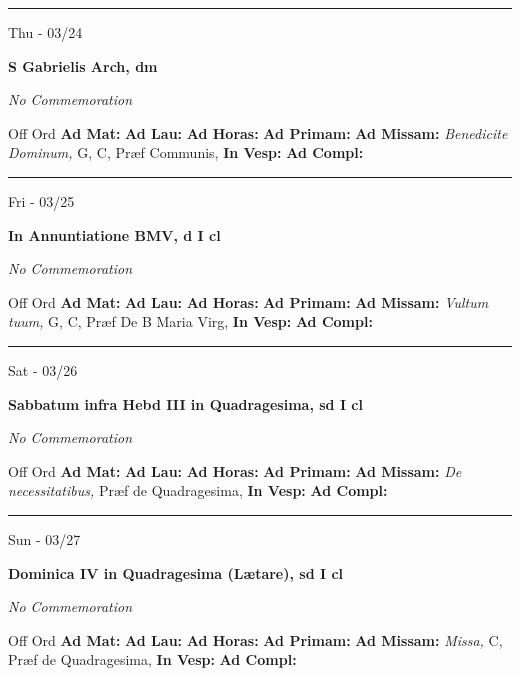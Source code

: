 \documentclass[letterpaper, 10pt]{article}
\begin{document}
\hrule
\begin{center}
Thu - 03/24
\end{center}\textbf{ \large S Gabrielis Arch, \textnormal{\normalsize dm}}

\textit{No Commemoration}\begin{justify}
Off Ord
\textbf{Ad Mat: }
\textbf{Ad Lau: }
\textbf{Ad Horas: }
\textbf{Ad Primam: }
\textbf{Ad Missam:} \textit{Benedicite Dominum, } G, C, Præf Communis, 
\textbf{In Vesp: }
\textbf{Ad Compl: }\end{justify}



\hrule
\begin{center}
Fri - 03/25
\end{center}\textbf{ \large In Annuntiatione BMV, \textnormal{\normalsize d I cl}}

\textit{No Commemoration}\begin{justify}
Off Ord
\textbf{Ad Mat: }
\textbf{Ad Lau: }
\textbf{Ad Horas: }
\textbf{Ad Primam: }
\textbf{Ad Missam:} \textit{Vultum tuum, } G, C, Præf De B Maria Virg, 
\textbf{In Vesp: }
\textbf{Ad Compl: }\end{justify}



\hrule
\begin{center}
Sat - 03/26
\end{center}\textbf{ \large Sabbatum infra Hebd III in Quadragesima, \textnormal{\normalsize sd I cl}}

\textit{No Commemoration}\begin{justify}
Off Ord
\textbf{Ad Mat: }
\textbf{Ad Lau: }
\textbf{Ad Horas: }
\textbf{Ad Primam: }
\textbf{Ad Missam:} \textit{De necessitatibus, } Præf de Quadragesima, 
\textbf{In Vesp: }
\textbf{Ad Compl: }\end{justify}



\hrule
\begin{center}
Sun - 03/27
\end{center}\textbf{ \large Dominica IV in Quadragesima (Lætare), \textnormal{\normalsize sd I cl}}

\textit{No Commemoration}\begin{justify}
Off Ord
\textbf{Ad Mat: }
\textbf{Ad Lau: }
\textbf{Ad Horas: }
\textbf{Ad Primam: }
\textbf{Ad Missam:} \textit{Missa, } C, Præf de Quadragesima, 
\textbf{In Vesp: }
\textbf{Ad Compl: }\end{justify}
\end{document}
